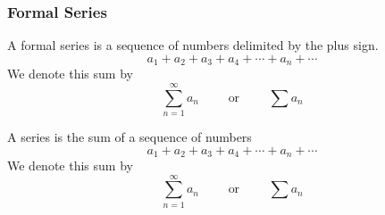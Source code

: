 \begin{frame}
\frametitle{Formal Series}
\begin{definition}
A formal series is a sequence of numbers delimited by the plus sign.
\[
a_1 + a_2 + a_3 + a_4 + \cdots + a_n + \cdots 
\]
We denote this sum by
\[
\sum_{n = 1}^\infty a_n \qquad \textrm{ or } \qquad \sum a_n
\]
\end{definition}
\begin{definition}[Series]
A series is the sum of a sequence of numbers
\[
a_1 + a_2 + a_3 + a_4 + \cdots + a_n + \cdots 
\]
We denote this sum by
\[
\sum_{n = 1}^\infty a_n \qquad \textrm{ or } \qquad \sum a_n
\]
\end{definition}
\end{frame}
